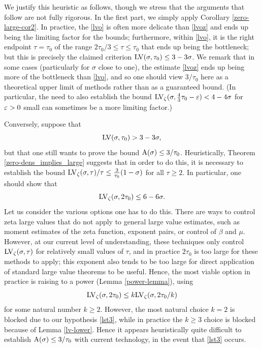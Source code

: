 We justify this heuristic as follows, though we stress that the arguments that follow are not fully rigorous.  In the first part, we simply apply Corollary \ref{zero-large-cor2}.  In practice, the \eqref{lvo} is often more delicate than \eqref{lvoz} and ends up being the limiting factor for the bounds; furthermore, within \eqref{lvo}, it is the right endpoint $\tau=\tau_0$ of the range $2\tau_0/3 \leq \tau \leq \tau_0$ that ends up being the bottleneck; but this is precisely the claimed criterion $\mathrm{LV}(\sigma, \tau_0) \leq 3-3\sigma$.  We remark that in some cases (particularly for $\sigma$ close to one), the estimate \eqref{lvoz} ends up being more of the bottleneck than \eqref{lvo}, and so one should view $3/\tau_0$ here as a theoretical upper limit of methods rather than as a guaranteed bound.  (In particular, the need to also establish the bound $\mathrm{LV}_\zeta(\sigma, \frac{4}{3}\tau_0-\varepsilon) < 4-4\sigma$ for $\varepsilon>0$ small can sometimes be a more limiting factor.)

Conversely, suppose that
\begin{equation}\label{lst3}
    \mathrm{LV}(\sigma,\tau_0) > 3-3\sigma,
\end{equation}
but that one still wants to prove the bound $\mathrm{A}(\sigma) \leq 3/\tau_0$. Heuristically, Theorem \ref{zero-dens_implies_large} suggests that in order to do this, it is necessary to establish the bound $\mathrm{LV}_\zeta(\sigma,\tau)/\tau \leq \frac{3}{\tau_0}(1-\sigma)$ for all $\tau \geq 2$.  In particular, one should show that
$$ \mathrm{LV}_\zeta(\sigma,2\tau_0) \leq 6-6\sigma.$$
Let us consider the various options one has to do this.  There are ways to control zeta large values that do not apply to general large value estimates, such as moment estimates of the zeta function, exponent pairs, or control of $\beta$ and $\mu$.  However, at our current level of understanding, these techniques only control $\mathrm{LV}_\zeta(\sigma,\tau)$ for relatively small values of $\tau$, and in practice $2\tau_0$ is too large for these methods to apply; this exponent also tends to be too large for direct application of standard large value theorems to be useful.  Hence, the most viable option in practice is raising to a power (Lemma \ref{power-lemma}), using
$$ \mathrm{LV}_\zeta(\sigma,2\tau_0) \leq k \mathrm{LV}_\zeta(\sigma,2\tau_0/k)$$
for some natural number $k \geq 2$.  However, the most natural choice $k=2$ is blocked due to our hypothesis \eqref{lst3}, while in practice the $k \geq 3$ choice is blocked because of Lemma \ref{lv-lower}.  Hence it appears heuristically quite difficult to establish $\mathrm{A}(\sigma) \leq 3/\tau_0$ with current technology, in the event that \eqref{lst3} occurs.


